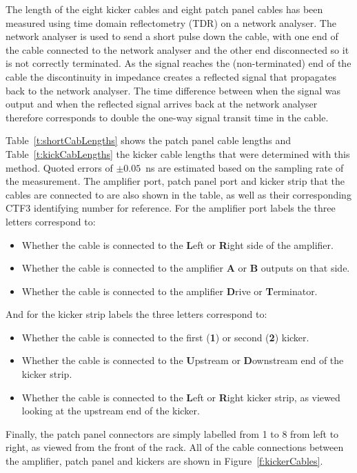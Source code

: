 The length of the eight kicker cables and eight patch panel cables has been measured using time domain reflectometry (TDR) on a network analyser. The network analyser is used to send a short pulse down the cable,  with one end of the cable connected to the network analyser and the other end disconnected so it is not correctly terminated. As the signal reaches the (non-terminated) end of the cable the discontinuity in impedance creates a reflected signal that propagates back to the network analyser. The time difference between when the signal was output and when the reflected signal arrives back at the network analyser therefore corresponds to double the one-way signal transit time in the cable.

Table~\ref{t:shortCabLengths} shows the patch panel cable lengths and Table~\ref{t:kickCabLengths} the kicker cable lengths that were determined with this method. Quoted errors of \(\pm0.05\)~ns are estimated based on the sampling rate of the measurement. The amplifier port, patch panel port and kicker strip that the cables are connected to are also shown in the table, as well as their corresponding CTF3 identifying number for reference. For the amplifier port labels the three letters correspond to:
\begin{itemize}
\item Whether the cable is connected to the \textbf{L}eft or \textbf{R}ight side of the amplifier.
\item  Whether the cable is connected to the amplifier \textbf{A} or \textbf{B} outputs on that side.
\item Whether the cable is connected to the amplifier \textbf{D}rive or \textbf{T}erminator.
\end{itemize}
And for the kicker strip labels the three letters correspond to:
\begin{itemize}
\item Whether the cable is connected to the first (\textbf{1}) or second (\textbf{2}) kicker.
\item  Whether the cable is connected to the \textbf{U}pstream or \textbf{D}ownstream end of the kicker strip.
\item Whether the cable is connected to the \textbf{L}eft or \textbf{R}ight kicker strip, as viewed looking at the upstream end of the kicker.
\end{itemize}
Finally, the patch panel connectors are simply labelled from 1 to 8 from left to right, as viewed from the front of the rack. All of the cable connections between the amplifier, patch panel and kickers are shown in Figure~\ref{f:kickerCables}.

